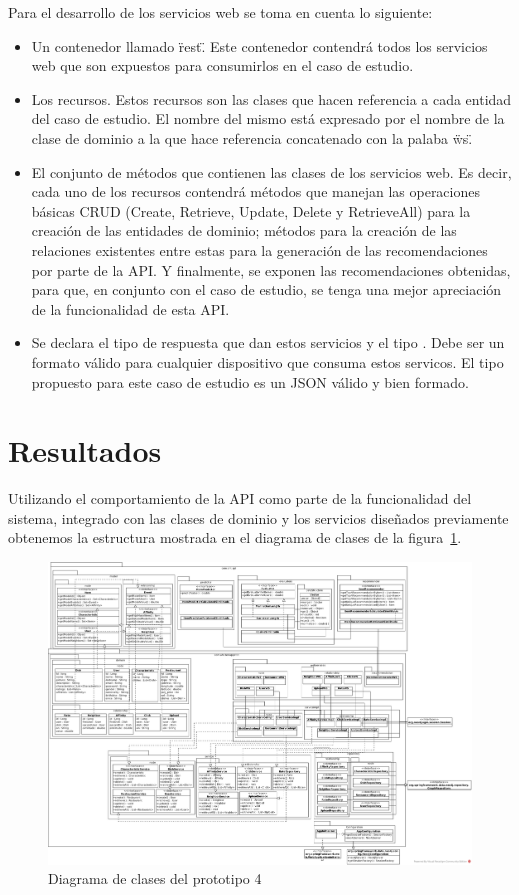 Para el desarrollo de los servicios web se toma en cuenta lo siguiente:
\begin{itemize}
	\item Un contenedor llamado \"rest\". Este contenedor contendrá todos los servicios web que son expuestos para consumirlos en el caso de estudio.
	\item Los recursos. Estos recursos son las clases que hacen referencia a cada entidad del caso de estudio. El nombre del mismo está expresado por el nombre de la clase de dominio a la que hace referencia concatenado con la palaba \"ws\".
	\item El conjunto de métodos que contienen las clases de los servicios web. Es decir, cada uno de los recursos contendrá métodos que manejan las operaciones básicas CRUD (Create, Retrieve, Update, Delete y RetrieveAll) para la creación de las entidades de dominio; métodos para la creación de las relaciones existentes entre estas para la generación de las recomendaciones por parte de la API. Y finalmente, se exponen las recomendaciones obtenidas, para que, en conjunto con el caso de estudio, se tenga una mejor apreciación de la funcionalidad de esta API.
	\item Se declara el tipo de respuesta que dan estos servicios y el tipo . Debe ser un formato válido para cualquier dispositivo que consuma estos servicos. El tipo propuesto para este caso de estudio es un JSON válido y bien formado.
\end{itemize}

\section{Resultados}
Utilizando el comportamiento de la API como parte de la funcionalidad del sistema, integrado con las clases de dominio y los servicios diseñados previamente obtenemos la estructura mostrada en el diagrama de clases de la figura~\ref{fig:monster_classes}. 

\begin{landscape}
	\begin{figure}[h!]
		\centering
		\includegraphics[width=25cm]{./images/monster_class}
		\caption{Diagrama de clases del prototipo 4}
		\label{fig:monster_classes}
	\end{figure}
\end{landscape}

